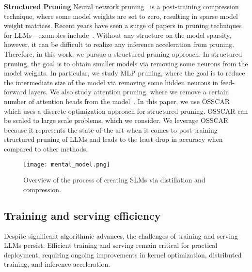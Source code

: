 \noindent\textbf{Structured Pruning} Neural network pruning~\cite{obd,obs} is a post-training compression technique, where some model weights are set to zero, resulting in sparse model weight matrices. Recent years have seen a surge of papers in pruning techniques for LLMs---examples include~\cite{meng2024alps,frantar2023sparsegpt,sun2023simple}. Without any structure on the model sparsity, however, it can be difficult to realize any inference acceleration from pruning. Therefore, in this work, we pursue a structured pruning approach.
In structured pruning, the goal is to obtain smaller models via removing some neurons from the model weights. In particular, we study MLP pruning, where the goal is to reduce the intermediate size of the model via removing some hidden neurons in feed-forward layers. We also study attention pruning, where we remove a certain number of attention heads from the model~\cite{meng2024osscar,structured1,structured2}.
In this paper, we use OSSCAR~\cite{meng2024osscar} which uses a discrete optimization approach for structured pruning. OSSCAR can be scaled to large scale problems, which we consider. We leverage OSSCAR because it represents the state-of-the-art when it comes to post-training structured pruning of LLMs and leads to the least drop in accuracy when compared to other methods. 

\begin{figure*}[hbpt]
    \centering
    \texttt{[image: mental\_model.png]} 
    \caption{Overview of the process of creating SLMs via distillation and compression.}
    \label{fig:mental_model}
\end{figure*}

\subsection{Training and serving efficiency} 
\label{subsec:Training and serving efficiency}

Despite significant algorithmic advances, the challenges of training and serving LLMs persist. Efficient training and serving remain critical for practical deployment, requiring ongoing improvements in kernel optimization, distributed training, and inference acceleration.

